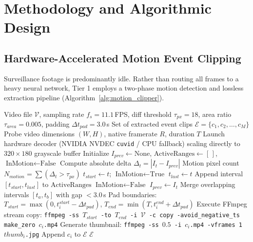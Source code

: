 \documentclass[10pt, conference]{IEEEtran}
\begin{document}
\section{Methodology and Algorithmic Design}
\label{sec:method}

\subsection{Hardware-Accelerated Motion Event Clipping}
Surveillance footage is predominantly idle. Rather than routing all frames to a heavy neural network, Tier 1 employs a two-phase motion detection and lossless extraction pipeline (Algorithm~\ref{alg:motion_clipper}).

\begin{algorithm}[!t]
\caption{Ultra-Fast Hardware Motion Event Clipper}
\label{alg:motion_clipper}
\begin{algorithmic}[1]
\REQUIRE Video file $\mathcal{V}$, sampling rate $f_s = 11.1$\,FPS, diff threshold $\tau_{px} = 18$, area ratio $\tau_{area} = 0.005$, padding $\Delta t_{pad} = 3.0$\,s
\ENSURE Set of extracted event clips $\mathcal{E} = \{c_1, c_2, \dots, c_M\}$
\STATE Probe video dimensions $(W, H)$, native framerate $R$, duration $T$
\STATE Launch hardware decoder (NVIDIA NVDEC \texttt{cuvid} / CPU fallback) scaling directly to $320 \times 180$ grayscale buffer
\STATE Initialize $I_{prev} \leftarrow \text{None}$, $\text{ActiveRanges} \leftarrow [\,]$, $\text{InMotion} \leftarrow \text{False}$
        \STATE Compute absolute delta $\Delta_t = |I_t - I_{prev}|$
        \STATE Motion pixel count $N_{motion} = \sum (\Delta_t > \tau_{px})$
                \STATE $t_{start} \leftarrow t$; $\text{InMotion} \leftarrow \text{True}$
            \ENDIF
            \STATE $t_{last} \leftarrow t$
        \ELSE
                \STATE Append interval $[t_{start}, t_{last}]$ to $\text{ActiveRanges}$
                \STATE $\text{InMotion} \leftarrow \text{False}$
            \ENDIF
        \ENDIF
    \ENDIF
    \STATE $I_{prev} \leftarrow I_t$
\ENDFOR
\STATE Merge overlapping intervals $[t_a, t_b]$ with gap $< 3.0$\,s
    \STATE Pad boundaries: $T_{start} = \max(0, t_i^{start} - \Delta t_{pad})$, $T_{end} = \min(T, t_i^{end} + \Delta t_{pad})$
    \STATE Execute FFmpeg stream copy:
    \STATE \texttt{ffmpeg -ss $T_{start}$ -to $T_{end}$ -i $\mathcal{V}$ -c copy -avoid\_negative\_ts make\_zero $c_i$.mp4}
    \STATE Generate thumbnail: \texttt{ffmpeg -ss $0.5$ -i $c_i$.mp4 -vframes 1 $thumb_i$.jpg}
    \STATE Append $c_i$ to $\mathcal{E}$
\ENDFOR
\RETURN $\mathcal{E}$
\end{algorithmic}
\end{algorithm}
\end{document}
